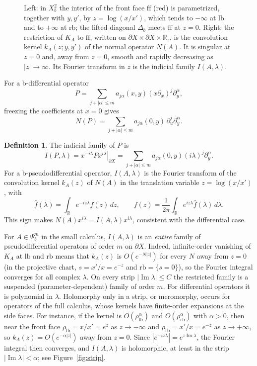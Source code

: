 \documentclass[12pt,oneside,reqno]{article}
\theoremstyle{plain}
\theoremstyle{definition}
\newtheorem{definition}[theorem]{Definition}
\theoremstyle{remark}
\begin{document}
\begin{figure}[htbp]
\begin{tikzpicture}[>=Latex,thick,font=\small]
\end{tikzpicture}
\caption[Front-face restriction and the normal operator]{Left: in
\(X_b^2\) the interior of the front face \(\mathrm{ff}\) (red) is
parametrized, together with \(y,y'\), by \(z=\log(x/x')\), which tends to
\(-\infty\) at \(\mathrm{lb}\) and to \(+\infty\) at \(\mathrm{rb}\); the
lifted diagonal \(\Delta_b\) meets \(\mathrm{ff}\) at \(z=0\).  Right: the
restriction of \(K_A\) to \(\mathrm{ff}\), written on
\(\partial X\times\partial X\times\mathbb R_z\), is the convolution kernel
\(k_A(z;y,y')\) of the normal operator \(N(A)\).  It is singular at
\(z=0\) and, away from \(z=0\), smooth and rapidly decreasing as
\(|z|\to\infty\).  Its Fourier transform in \(z\) is the indicial family
\(I(A,\lambda)\).}
\label{fig:normal-op}
\end{figure}

For a b-differential operator
\[
 P=\sum_{j+|\alpha|\leq m}
 a_{j\alpha}(x,y)(x\partial_x)^j\partial_y^\alpha,
\]
freezing the coefficients at \(x=0\) gives
\[
 N(P)=
 \sum_{j+|\alpha|\leq m}
 a_{j\alpha}(0,y)\,\partial_u^j\partial_y^\alpha.
\]

\begin{definition}
The indicial family of \(P\) is
\[
 I(P,\lambda)
 =
 \left.x^{-i\lambda}P x^{i\lambda}\right|_{\partial X}
 =
 \sum_{j+|\alpha|\leq m}
 a_{j\alpha}(0,y)(i\lambda)^j\partial_y^\alpha.
\]
For a b-pseudodifferential operator, \(I(A,\lambda)\) is the Fourier
transform of the convolution kernel \(k_A(z)\) of \(N(A)\) in the
translation variable \(z=\log(x/x')\), with
\[
 \widehat f(\lambda)=\int_{\mathbb R}e^{-iz\lambda}f(z)\,dz,
 \qquad
 f(z)=\frac1{2\pi}\int_{\mathbb R}e^{iz\lambda}\widehat f(\lambda)\,d\lambda .
\]
This sign makes \(N(A)x^{i\lambda}=I(A,\lambda)x^{i\lambda}\), consistent
with the differential case.
\end{definition}

For \(A\in\Psi_b^m\) in the small calculus, \(I(A,\lambda)\) is an
\emph{entire} family of pseudodifferential operators of order \(m\) on
\(\partial X\). Indeed, infinite-order vanishing of \(K_A\) at
\(\mathrm{lb}\) and \(\mathrm{rb}\) means that \(k_A(z)\) is
\(O(e^{-N|z|})\) for every \(N\) away from \(z=0\) (in the projective
chart, \(s=x'/x=e^{-z}\) and \(\mathrm{rb}=\{s=0\}\)), so the Fourier
integral converges for all complex \(\lambda\). On every strip
\(|\operatorname{Im}\lambda|\leq C\) the restricted family is a suspended
(parameter-dependent) family of order \(m\). For differential operators it
is polynomial in \(\lambda\). Holomorphy only in a strip, or
meromorphy, occurs for operators of the full calculus, whose kernels have
finite-order expansions at the side faces.  For instance, if the kernel is
\(O(\rho_{\mathrm{lb}}^\alpha)\) and \(O(\rho_{\mathrm{rb}}^\alpha)\) with
\(\alpha>0\), then near the front face \(\rho_{\mathrm{lb}}=x/x'=e^{z}\) as
\(z\to-\infty\) and \(\rho_{\mathrm{rb}}=x'/x=e^{-z}\) as \(z\to+\infty\), so
\(k_A(z)=O(e^{-\alpha|z|})\) away from \(z=0\).  Since
\(|e^{-iz\lambda}|=e^{z\operatorname{Im}\lambda}\), the Fourier integral
then converges, and \(I(A,\lambda)\) is holomorphic, at least in the strip
\(|\operatorname{Im}\lambda|<\alpha\); see Figure~\ref{fig:strip}.
\end{document}
